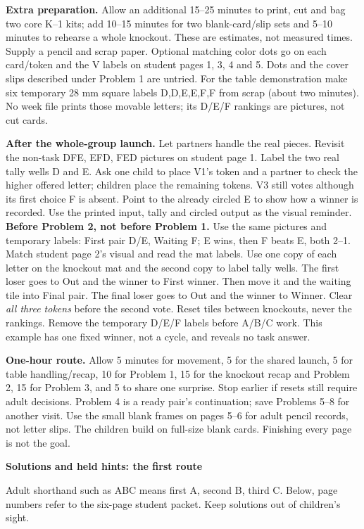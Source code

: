 \documentclass[11pt]{article}
\newcommand{\head}[1]{\par\textbf{\large #1}\par}
\begin{document}
\textbf{Extra preparation.} Allow an additional 15--25 minutes to print, cut and bag two core K--1 kits; add 10--15 minutes for two blank-card/slip sets and 5--10 minutes to rehearse a whole knockout. These are estimates, not measured times. Supply a pencil and scrap paper. Optional matching color dots go on each card/token and the V labels on student pages 1, 3, 4 and 5. Dots and the cover slips described under Problem 1 are untried. For the table demonstration make six temporary 28 mm square labels D,D,E,E,F,F from scrap (about two minutes). No week file prints those movable letters; its D/E/F rankings are pictures, not cut cards.

\textbf{After the whole-group launch.} Let partners handle the real pieces. Revisit the non-task DFE, EFD, FED pictures on student page 1. Label the two real tally wells D and E. Ask one child to place V1's token and a partner to check the higher offered letter; children place the remaining tokens. V3 still votes although its first choice F is absent. Point to the already circled E to show how a winner is recorded. Use the printed input, tally and circled output as the visual reminder.
\textbf{Before Problem 2, not before Problem 1.} Use the same pictures and temporary labels: First pair D/E, Waiting F; E wins, then F beats E, both 2--1. Match student page 2's visual and read the mat labels. Use one copy of each letter on the knockout mat and the second copy to label tally wells. The first loser goes to Out and the winner to First winner. Then move it and the waiting tile into Final pair. The final loser goes to Out and the winner to Winner. Clear \emph{all three tokens} before the second vote. Reset tiles between knockouts, never the rankings. Remove the temporary D/E/F labels before A/B/C work. This example has one fixed winner, not a cycle, and reveals no task answer.

\textbf{One-hour route.} Allow 5 minutes for movement, 5 for the shared launch, 5 for table handling/recap, 10 for Problem 1, 15 for the knockout recap and Problem 2, 15 for Problem 3, and 5 to share one surprise. Stop earlier if resets still require adult decisions. Problem 4 is a ready pair's continuation; save Problems 5--8 for another visit. Use the small blank frames on pages 5--6 for adult pencil records, not letter slips. The children build on full-size blank cards. Finishing every page is not the goal.

\newpage
\head{Solutions and held hints: the first route}
Adult shorthand such as ABC means first A, second B, third C. Below, page numbers refer to the six-page student packet. Keep solutions out of children's sight.
\end{document}
